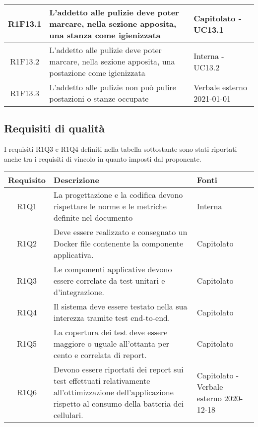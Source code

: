\begin{center}
\begin{longtable}{|c|p{10cm}|p{4cm}|}
					\hline
R1F13.1&L'addetto alle pulizie deve poter marcare, nella sezione apposita, una stanza come igienizzata	& Capitolato - UC13.1	\\
						\hline
			R1F13.2&L'addetto alle pulizie deve poter marcare, nella sezione apposita, una postazione come igienizzata	&Interna - UC13.2 	\\
					\hline
			R1F13.3&L'addetto alle pulizie non può pulire postazioni o stanze occupate	& Verbale esterno 2021-01-01	\\
					\hline
						
	\end{longtable}
\end{center}
\subsection{Requisiti di qualità}
I requisiti R1Q3 e R1Q4 definiti nella tabella sottostante sono stati riportati anche tra i requisiti di vincolo in quanto imposti dal proponente.
\begin{center}
	\begin{longtable}{|c|p{10cm}|p{4cm}|}
		\hline
		\rowcolor{lighter-grayer}
		\textbf{Requisito} & \textbf{Descrizione} & \textbf{Fonti}  \\
		\hline
		\endfirsthead
		
		 R1Q1 &La progettazione e la codifica devono rispettare le norme e le metriche definite nel documento \dext{Piano di qualifica v1.0.0} & Interna\\
		\hline	
		R1Q2 &Deve essere realizzato e consegnato un Docker file
		contenente la componente applicativa. & Capitolato\\
		\hline
		R1Q3 &Le componenti applicative devono essere correlate da test unitari e d’integrazione. & Capitolato\\
		\hline
		R1Q4 &Il sistema deve essere testato nella sua interezza tramite test end-to-end. & Capitolato\\
		\hline
		R1Q5 &La copertura dei test deve essere maggiore o uguale all'ottanta per cento e correlata di report. & Capitolato\\
		\hline
		R1Q6 &Devono essere riportati dei report sui test effettuati relativamente all’ottimizzazione dell’applicazione rispetto al consumo della
		batteria dei cellulari. & Capitolato - Verbale esterno 2020-12-18 \\
		\hline
		
	\end{longtable}
\end{center}

